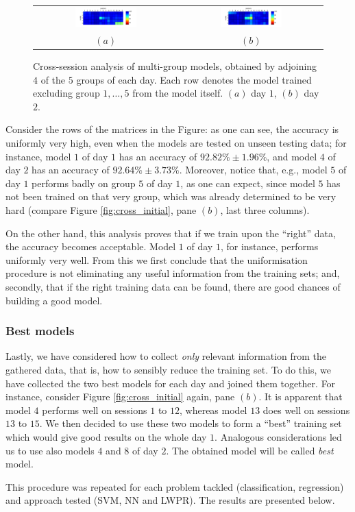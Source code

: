 \begin{figure}[!ht] \centering
  \begin{tabular}{cc}
    \includegraphics[width=0.45\textwidth]{figs/fig_resCross_day1_big} & \includegraphics[width=0.45\textwidth]{figs/fig_resCross_day2_big} \\
    $(a)$ & $(b)$ \\
  \end{tabular}
  \caption{Cross-session analysis of multi-group models, obtained by adjoining $4$
    of the $5$ groups of each day. Each row denotes the model trained
    excluding group $1,\ldots,5$ from the model itself. $(a)$ day $1$, $(b)$ day $2$.}
  \label{fig:bigmodels}
\end{figure}

Consider the rows of the matrices in the Figure: as one can see, the
accuracy is uniformly very high, even when the models are tested on
unseen testing data; for instance, model $1$ of day $1$ has an
accuracy of $92.82\% \pm 1.96\%$, and model $4$ of day $2$ has an
accuracy of $92.64\% \pm 3.73\%$. Moreover, notice that, e.g., model
$5$ of day $1$ performs badly on group $5$ of day $1$, as one can
expect, since model $5$ has not been trained on that very group, which
was already determined to be very hard (compare Figure
\ref{fig:cross_initial}, pane $(b)$, last three columns).

On the other hand, this analysis proves that if we train upon the
``right'' data, the accuracy becomes acceptable. Model $1$ of day $1$,
for instance, performs uniformly very well. From this we first
conclude that the uniformisation procedure is not eliminating any
useful information from the training sets; and, secondly, that if the
right training data can be found, there are good chances of building a
good model.

\subsubsection{Best models}

Lastly, we have considered how to collect \emph{only} relevant
information from the gathered data, that is, how to sensibly reduce
the training set. To do this, we have collected the two best models
for each day and joined them together. For instance, consider Figure
\ref{fig:cross_initial} again, pane $(b)$. It is apparent that model
$4$ performs well on sessions $1$ to $12$, whereas model $13$ does
well on sessions $13$ to $15$. We then decided to use these two models
to form a ``best'' training set which would give good results on the
whole day $1$. Analogous considerations led us to use also models $4$
and $8$ of day $2$. The obtained model will be called \emph{best}
model.

This procedure was repeated for each problem tackled (classification,
regression) and approach tested (SVM, NN and LWPR). The results are
presented below.
